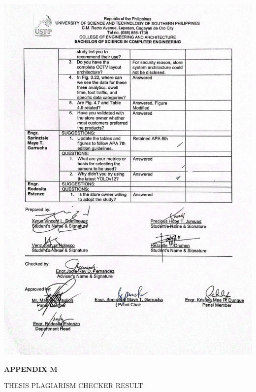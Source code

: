 \begin{center}
	\includegraphics[width=1\textwidth]{app/L3.pdf}
\end{center}

\clearpage

\begin{center}
	{\bf APPENDIX M}\\[24pt]
\end{center}

\begin{center}
	THESIS PLAGIARISM CHECKER RESULT
\end{center}

